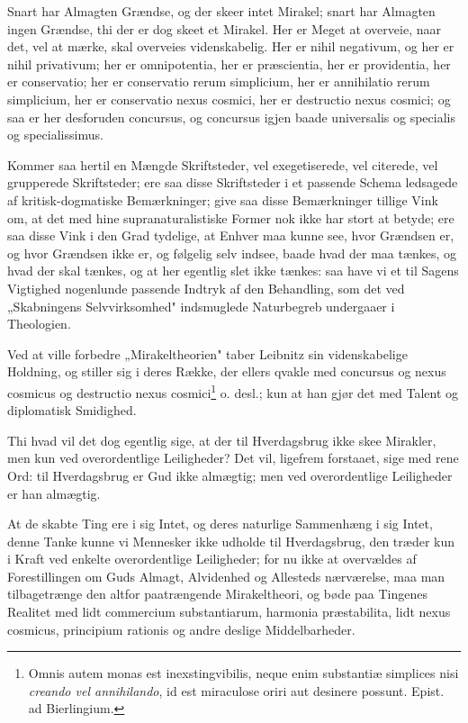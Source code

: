 \documentclass[12pt,a4paper]{article}
\newcommand{\opage}[1]{\marginnote{\footnotesize\textit{[#1]}}}
\begin{document}
Snart har Almagten Grændse, og der skeer intet Mirakel; snart har Almagten ingen
Grændse, thi der er dog skeet et Mirakel. Her er Meget at overveie, naar det, vel
at mærke, skal overveies videnskabelig. Her er nihil negativum, og her er nihil
privativum; her er omnipotentia, her er præscientia, her er providentia, her er
conservatio; her er conservatio rerum simplicium, her er annihilatio rerum
simplicium, her er conservatio nexus
\opage{27} cosmici, her er destructio nexus cosmici; og saa er her desforuden concursus, og
concursus igjen baade universalis og specialis og specialissimus.

Kommer saa hertil en Mængde Skriftsteder, vel exegetiserede, vel citerede, vel
grupperede Skriftsteder; ere saa disse Skriftsteder i et passende Schema
ledsagede af kritisk-dogmatiske Bemærkninger; give saa disse Bemærkninger tillige
Vink om, at det med hine supranaturalistiske Former nok ikke har stort at betyde;
ere saa disse Vink i den Grad tydelige, at Enhver maa kunne see, hvor Grændsen
er, og hvor Grændsen ikke er, og følgelig selv indsee, baade hvad der maa tænkes,
og hvad der skal tænkes, og at her egentlig slet ikke tænkes: saa have vi et til
Sagens Vigtighed nogenlunde passende Indtryk af den Behandling, som det ved
„Skabningens Selvvirksomhed" indsmuglede Naturbegreb undergaaer i Theologien.

Ved at ville forbedre „Mirakeltheorien" taber Leibnitz sin videnskabelige
Holdning, og stiller sig i deres Række, der ellers qvakle med concursus og nexus
cosmicus og destructio nexus cosmici\footnote{Omnis autem monas est
inexstingvibilis, neque enim substantiæ simplices nisi \emph{creando vel
annihilando}, id est miraculose oriri aut desinere possunt. Epist. ad
Bierlingium.} o. desl.; kun at han gjør det med Talent og diplomatisk Smidighed.

Thi hvad vil det dog egentlig sige, at der til Hverdagsbrug ikke skee Mirakler,
men kun ved overordentlige Leiligheder? Det vil, ligefrem forstaaet, sige med
rene Ord: til Hverdagsbrug er Gud ikke almægtig; men ved overordentlige
Leiligheder er han almægtig.

At de skabte Ting ere i sig Intet, og deres naturlige Sammenhæng i sig Intet,
denne Tanke kunne vi Mennesker ikke udholde til Hverdagsbrug, den træder kun i
Kraft ved enkelte overordentlige Leiligheder; for nu ikke at overvældes af
Forestillingen om Guds Almagt, Alvidenhed og Allesteds%
\opage{28}nærværelse, maa man tilbagetrænge den altfor paatrængende Mirakeltheori, og bøde
paa Tingenes Realitet med lidt commercium substantiarum, harmonia præstabilita,
lidt nexus cosmicus, principium rationis og andre deslige Middelbarheder.
\end{document}
